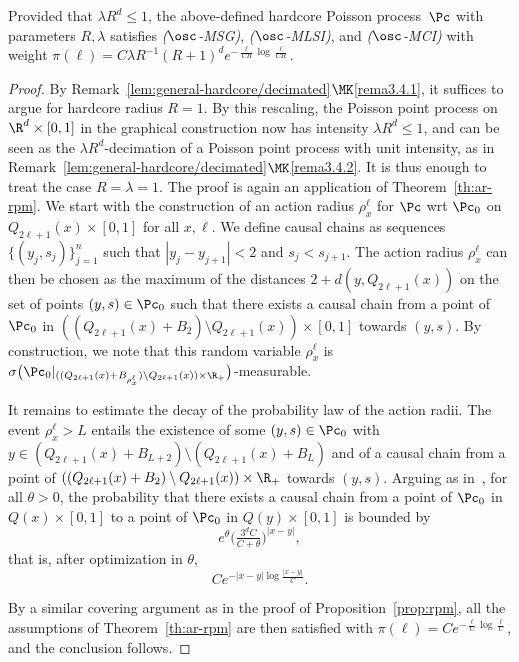 \begin{prop}\label{prop:SG0}
Provided that $\lambda R^d\le1$, the above-defined hardcore Poisson process~$\Pc$ with parameters $R,\lambda$ satisfies \emph{($\osc$-MSG)}, \emph{($\osc$-MLSI)}, and \emph{($\osc$-MCI)} with weight $\pi(\ell)=C\lambda R^{-1}(R+1)^{d} e^{-\frac{\ell}{CR}\log\frac\ell{CR}}$.
\end{prop}



\begin{proof}
By Remark~\ref{lem:general-hardcore/decimated}$\MK$\eqref{rema3.4.1}, it suffices to argue for hardcore radius $R=1$. By this rescaling, the Poisson point process on $\R^d \times [0,1]$ in the graphical construction now has intensity $\lambda R^d \le1$, and can be seen as the $\lambda R^d$-decimation of a Poisson point process with unit intensity, as in Remark~\ref{lem:general-hardcore/decimated}$\MK$\eqref{rema3.4.2}. It is thus enough to treat the case $R=\lambda=1$. The proof is again an application of Theorem~\ref{th:ar-rpm}. We start with the construction of an action radius $\rho_{x}^\ell$ for $\Pc$ wrt $\Pc_0$ on $Q_{2\ell+1}(x)\times[0,1]$ for all $x,\ell$. We define causal chains as sequences $\{(y_j,s_j)\}_{j=1}^n$ such that $|y_j-y_{j+1}|<2$ and $s_j<s_{j+1}$. The action radius $\rho_{x}^\ell$ can then be chosen as the maximum of the distances $2+d(y,Q_{2\ell+1}(x))$ on the set of points $(y,s)\in\Pc_0$ such that there exists a causal chain from a point of $\Pc_0$ in $((Q_{2\ell+1}(x)+B_{2})\setminus Q_{2\ell+1}(x))\times[0,1]$ towards $(y,s)$. By construction, we note that this random variable $\rho_x^\ell$ is $\sigma\big(\Pc_0|_{((Q_{2\ell+1}(x)+B_{\rho_x^\ell})\setminus Q_{2\ell+1}(x))\times\R_+}\big)$-measurable.

\noindent It remains to estimate the decay of the probability law of the action radii. The event $\rho_x^\ell>L$ entails the existence of some $(y,s)\in \Pc_0$ with $y\in(Q_{2\ell+1}(x)+B_{L+2})\setminus(Q_{2\ell+1}(x)+B_{L})$ and of a causal chain from a point of $((Q_{2\ell+1}(x)+B_{2})\setminus Q_{2\ell+1}(x))\times\R_+$ towards $(y,s)$. Arguing as in~\cite[proof of~(0.2) in Lemma~4.2]{Penrose-Yukich-02}, for all $\theta>0$, the probability that there exists a causal chain from a point of $\Pc_0$ in $Q(x)\times[0,1]$ to a point of $\Pc_0$ in $Q(y)\times[0,1]$ is bounded by
\[
e^\theta\big(\tfrac{3^dC}{C+\theta}\big)^{|x-y|},
\]
that is, after optimization in $\theta$,
\[
Ce^{-|x-y|\log\frac{|x-y|}{C}}.
\]


By a similar covering argument as in the proof of Proposition~\ref{prop:rpm}, all the assumptions of Theorem~\ref{th:ar-rpm} are then satisfied with $\pi(\ell)=Ce^{-\frac\ell C\log\frac\ell C}$, and the conclusion follows.
\end{proof}



